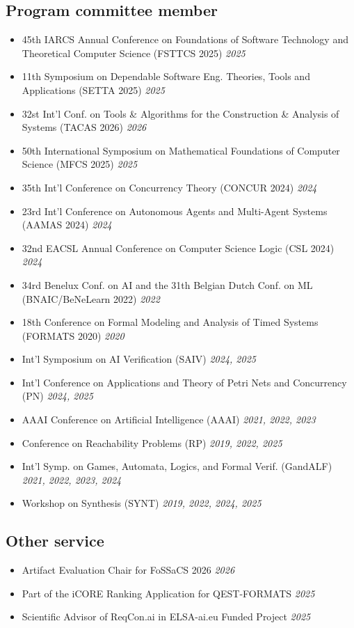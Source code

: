 \documentclass[10pt,a4paper]{moderncv}
\begin{document}
\subsection{Program committee member}
\begin{itemize}
  \item 45th IARCS Annual Conference on Foundations of Software Technology and
    Theoretical Computer Science (FSTTCS 2025) \hfill \textit{2025}
  \item 11th Symposium on Dependable Software Eng. Theories, Tools and
    Applications (SETTA 2025) \hfill \textit{2025}
  \item 32st Int'l Conf. on Tools \& Algorithms for the
    Construction \& Analysis of Systems (TACAS 2026) \hfill \textit{2026}
  \item 50th International Symposium on Mathematical Foundations of Computer
    Science (MFCS 2025) \hfill \textit{2025}
  \item 35th Int'l Conference on Concurrency Theory (CONCUR 2024) \hfill
    \textit{2024}
  \item 23rd Int'l Conference on Autonomous Agents and Multi-Agent
    Systems (AAMAS 2024) \hfill \textit{2024}
  \item 32nd EACSL Annual Conference on Computer Science Logic (CSL 2024)
    \hfill \textit{2024}
  \item 34rd Benelux Conf. on AI and the 31th
    Belgian Dutch Conf. on ML (BNAIC/BeNeLearn 2022) \hfill \textit{2022}
  \item 18th Conference on Formal Modeling and Analysis of Timed
    Systems (FORMATS 2020) \hfill \textit{2020}
  \item Int'l Symposium on AI Verification (SAIV) \hfill
    \textit{2024, 2025}
  \item Int'l Conference on Applications and Theory of Petri Nets
    and Concurrency (PN) \hfill \textit{2024, 2025}
  \item AAAI Conference on Artificial Intelligence (AAAI) \hfill
    \textit{2021, 2022, 2023}
  \item Conference on Reachability Problems (RP) \hfill \textit{2019, 2022,
    2025}
  \item Int'l Symp. on Games, Automata, Logics, and Formal
    Verif. (GandALF) \hfill \textit{2021, 2022, 2023, 2024}
  \item Workshop on Synthesis (SYNT) \hfill \textit{2019, 2022, 2024, 2025}
\end{itemize}

\subsection{Other service}
\begin{itemize}
  \item Artifact Evaluation Chair for FoSSaCS 2026 \hfill \textit{2026}
  \item Part of the iCORE Ranking Application for QEST-FORMATS \hfill
    \textit{2025}
  \item Scientific Advisor of ReqCon.ai in ELSA-ai.eu Funded Project \hfill
    \textit{2025}
\end{itemize}
\end{document}
